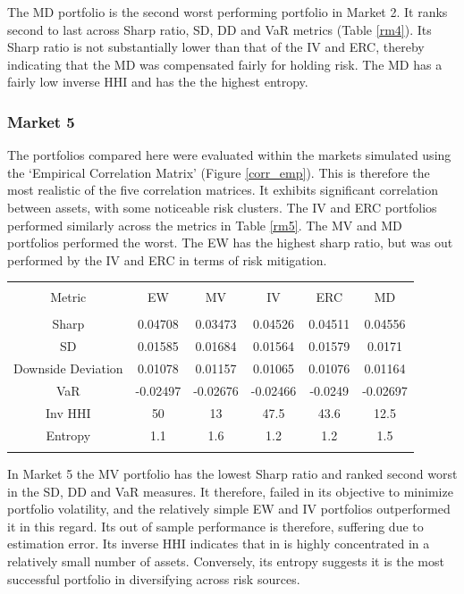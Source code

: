 \documentclass[11pt,preprint, authoryear]{elsarticle}
\let\origtable\table
\let\endorigtable\endtable
\renewenvironment{table}[1][2] {
    \expandafter\origtable\expandafter[H]
} {
    \endorigtable
}
\numberwithin{equation}{section}
\numberwithin{figure}{section}
\numberwithin{table}{section}
\begin{document}
The MD portfolio is the second worst performing portfolio in Market 2.
It ranks second to last across Sharp ratio, SD, DD and VaR metrics
(Table \ref{rm4}). Its Sharp ratio is not substantially lower than that
of the IV and ERC, thereby indicating that the MD was compensated fairly
for holding risk. The MD has a fairly low inverse HHI and has the the
highest entropy.

\hypertarget{market-5}{%
\subsubsection{Market 5}\label{market-5}}

The portfolios compared here were evaluated within the markets simulated
using the `Empirical Correlation Matrix' (Figure \ref{corr_emp}). This
is therefore the most realistic of the five correlation matrices. It
exhibits significant correlation between assets, with some noticeable
risk clusters. The IV and ERC portfolios performed similarly across the
metrics in Table \ref{rm5}. The MV and MD portfolios performed the
worst. The EW has the highest sharp ratio, but was out performed by the
IV and ERC in terms of risk mitigation.

\begin{table}[!htbp] \centering 
  \caption{Market 5 - Portfolio Risk Metrics} 
  \label{rm5} 
\begin{tabular}{@{\extracolsep{5pt}} cccccc} 
\\[-1.8ex]\hline 
\hline \\[-1.8ex] 
Metric & EW & MV & IV & ERC & MD \\ 
\hline \\[-1.8ex] 
Sharp & 0.04708 & 0.03473 & 0.04526 & 0.04511 & 0.04556 \\ 
SD & 0.01585 & 0.01684 & 0.01564 & 0.01579 & 0.0171 \\ 
Downside Deviation & 0.01078 & 0.01157 & 0.01065 & 0.01076 & 0.01164 \\ 
VaR & -0.02497 & -0.02676 & -0.02466 & -0.0249 & -0.02697 \\ 
Inv HHI & 50 & 13 & 47.5 & 43.6 & 12.5 \\ 
Entropy & 1.1 & 1.6 & 1.2 & 1.2 & 1.5 \\ 
\hline \\[-1.8ex] 
\end{tabular} 
\end{table}

In Market 5 the MV portfolio has the lowest Sharp ratio and ranked
second worst in the SD, DD and VaR measures. It therefore, failed in its
objective to minimize portfolio volatility, and the relatively simple EW
and IV portfolios outperformed it in this regard. Its out of sample
performance is therefore, suffering due to estimation error. Its inverse
HHI indicates that in is highly concentrated in a relatively small
number of assets. Conversely, its entropy suggests it is the most
successful portfolio in diversifying across risk sources.
\end{document}
